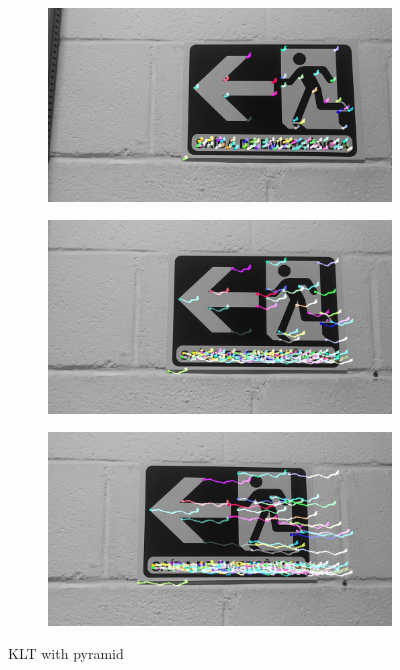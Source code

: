 \begin{figure}[!h]
    \hspace{-1cm}
	\begin{subfigure}{0.33\textwidth}
	  \centering
	  \includegraphics[width=0.99\linewidth]{figs/flow15x15-1.jpg}
	\end{subfigure}%
	\begin{subfigure}{0.33\textwidth}
	  \centering
	  \includegraphics[width=0.99\linewidth]{figs/flow15x15-2.jpg}
	\end{subfigure}%
	\begin{subfigure}{0.33\textwidth}
        \centering
      \includegraphics[width=0.99\linewidth]{figs/flow15x15-3.jpg}
    \end{subfigure}  
    \endminipage\hfill
    \caption{KLT with pyramid}    
	\label{fig:comparison-KLP-pyramid2}
\end{figure}

